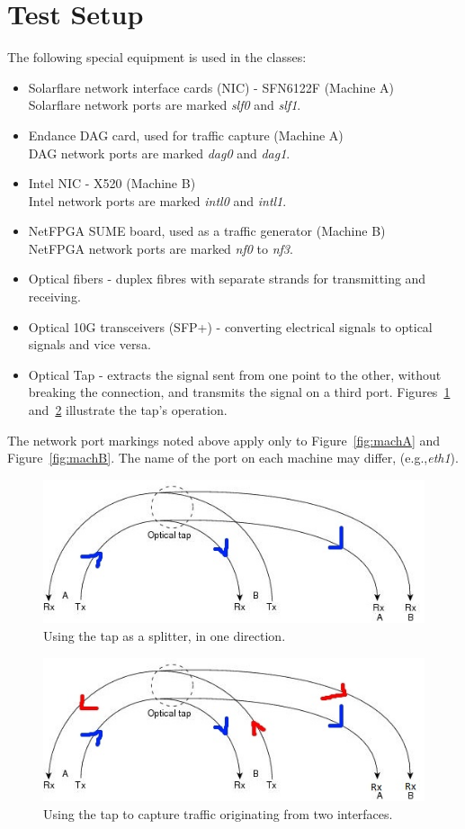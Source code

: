 \documentclass[]{scrartcl}
\begin{document}
\section{Test Setup}

The following special equipment is used in the classes:
\begin{itemize}
	\item Solarflare network interface cards (NIC) - SFN6122F (Machine A)\\
	Solarflare network ports are marked \textit{slf0} and \textit{slf1}.
	\item Endance DAG card, used for traffic capture (Machine A)\\
	DAG network ports are marked \textit{dag0} and \textit{dag1}.
	\item Intel NIC - X520 (Machine B)\\
	Intel network ports are marked \textit{intl0} and \textit{intl1}.
	\item NetFPGA SUME board, used as a traffic generator (Machine B)\\
	NetFPGA network ports are marked \textit{nf0} to \textit{nf3}.
	\item Optical fibers - duplex fibres with separate strands for transmitting and receiving.
	\item Optical 10G transceivers (SFP+) - converting electrical signals to optical signals and vice versa.
	\item Optical Tap - extracts the signal sent from one point to the other, without breaking the connection, and transmits the signal on a third port.
	Figures~\ref{fig:tap2} and~\ref{fig:tap} illustrate the tap's operation.
\end{itemize}
	
	The network port markings noted above apply only to Figure~\ref{fig:machA} and Figure~\ref{fig:machB}. The name of the port on each machine may differ, (e.g.,\textit{eth1}).
	
	\begin{figure}
		\includegraphics[width=0.5\linewidth]{"tap2"}
		\centering
		\caption{Using the tap as a splitter, in one direction.}
		\label{fig:tap2}
	\end{figure}
	\begin{figure}
		\includegraphics[width=0.5\linewidth]{"tap"}
		\centering
		\caption{Using the tap to capture traffic originating from two interfaces.}
		\label{fig:tap}
	\end{figure}
\end{document}
